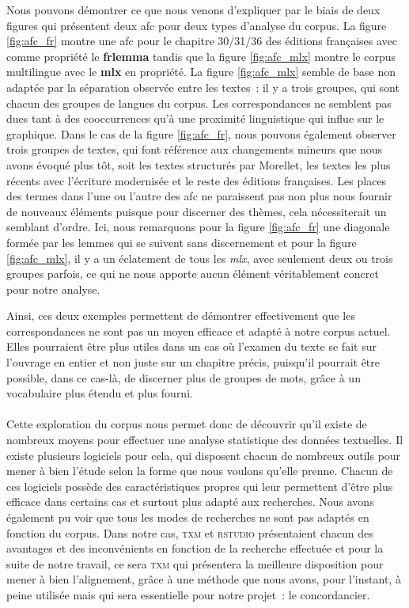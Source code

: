 Nous pouvons démontrer ce que nous venons d'expliquer par le biais de deux figures qui présentent deux \acrshort{afc} pour deux types d'analyse du corpus. La figure \ref{fig:afc_fr} montre une \acrshort{afc} pour le chapitre 30/31/36 des éditions françaises avec comme propriété le \textbf{frlemma} tandis que la figure \ref{fig:afc_mlx} montre le corpus multilingue avec le \textbf{mlx} en propriété. La figure \ref{fig:afc_mlx} semble de base non adaptée par la séparation observée entre les textes~: il y a trois groupes, qui sont chacun des groupes de langues du corpus. Les correspondances ne semblent pas dues tant à des cooccurrences qu'à une proximité linguistique qui influe sur le graphique. Dans le cas de la figure \ref{fig:afc_fr}, nous pouvons également observer trois groupes de textes, qui font référence aux changements mineurs que nous avons évoqué plus tôt, soit les textes structurés par Morellet, les textes les plus récents avec l'écriture modernisée et le reste des éditions françaises. Les places des termes dans l'une ou l'autre des \acrshort{afc} ne paraissent pas non plus nous fournir de nouveaux éléments puisque pour discerner des thèmes, cela nécessiterait un semblant d'ordre. Ici, nous remarquons pour la figure \ref{fig:afc_fr} une diagonale formée par les lemmes qui se suivent sans discernement et pour la figure \ref{fig:afc_mlx}, il y a un éclatement de tous les \emph{mlx}, avec seulement deux ou trois groupes parfois, ce qui ne nous apporte aucun élément véritablement concret pour notre analyse.

Ainsi, ces deux exemples permettent de démontrer effectivement que les correspondances ne sont pas un moyen efficace et adapté à notre corpus actuel. Elles pourraient être plus utiles dans un cas où l'examen du texte se fait sur l'ouvrage en entier et non juste sur un chapitre précis, puisqu'il pourrait être possible, dans ce cas-là, de discerner plus de groupes de mots, grâce à un vocabulaire plus étendu et plus fourni. \pagebreak

\paragraph{}Cette exploration du corpus nous permet donc de découvrir qu'il existe de nombreux moyens pour effectuer une analyse statistique des données textuelles. Il existe plusieurs logiciels pour cela, qui disposent chacun de nombreux outils pour mener à bien l'étude selon la forme que nous voulons qu'elle prenne. Chacun de ces logiciels possède des caractéristiques propres qui leur permettent d'être plus efficace dans certains cas et surtout plus adapté aux recherches. Nous avons également pu voir que tous les modes de recherches ne sont pas adaptés en fonction du corpus. Dans notre cas, \textsc{txm} et \textsc{rstudio} présentaient chacun des avantages et des inconvénients en fonction de la recherche effectuée et pour la suite de notre travail, ce sera \textsc{txm} qui présentera la meilleure disposition pour mener à bien l'alignement, grâce à une méthode que nous avons, pour l'instant, à peine utilisée mais qui sera essentielle pour notre projet~: le concordancier.  